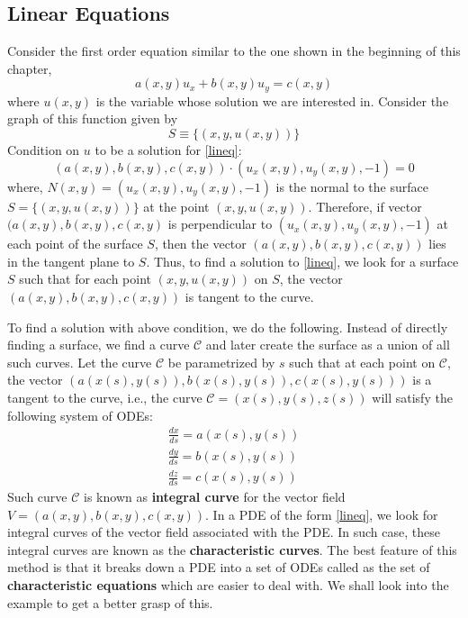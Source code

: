 \documentclass[11pt, a4paper]{report}
\begin{document}
\subsection{Linear Equations} \label{LinEq_sec}
Consider the first order equation similar to the one shown in the beginning of this chapter,
\begin{equation} \label{lineq}
    a(x, y)u_{x} + b(x, y)u_{y} = c(x, y)
\end{equation}
where $u(x, y)$ is the variable whose solution we are interested in. Consider the graph of this function given by
\begin{equation*}
    S \equiv \{(x, y, u(x, y))\}
\end{equation*}
Condition on $u$ to be a solution for \eqref{lineq}:
\begin{equation*}
    (a(x, y), b(x, y), c(x, y))\cdot\left(u_{x}(x, y), u_{y}(x, y), -1\right) = 0
\end{equation*}
where, $N(x, y) = \left(u_{x}(x, y), u_{y}(x, y), -1\right)$ is the normal to the surface $S = \{(x, y, u(x, y))\}$ 
at the point $(x, y, u(x, y))$. Therefore, if vector $(a(x, y), b(x, y), c(x, y)$ is perpendicular to $\left(u_{x}(x, y), u_{y}(x, y), -1\right)$
at each point of the surface $S$, then the vector $(a(x, y), b(x, y), c(x, y))$ lies in the tangent plane to $S$. 
Thus, to find a solution to \eqref{lineq}, we look for a surface $S$ such that for each point $(x, y, u(x, y))$ on 
$S$, the vector $(a(x, y), b(x, y), c(x, y))$ is tangent to the curve. 

To find a solution with above condition, we do the following. Instead of directly finding a surface, we find a curve
$\mathscr{C}$ and later create the surface as a union of all such curves. Let the curve $\mathscr{C}$ be parametrized
by $s$ such that at each point on $\mathscr{C}$, the vector $(a(x(s), y(s)), b(x(s), y(s)), c(x(s), y(s)))$ is a 
tangent to the curve, i.e., the curve $\mathscr{C} = (x(s), y(s), z(s))$ will satisfy the following system of ODEs:
\begin{equation}
    \begin{split}
        \frac{dx}{ds} = a(x(s), y(s))\\
        \frac{dy}{ds} = b(x(s), y(s))\\
        \frac{dz}{ds} = c(x(s), y(s))
    \end{split}
\end{equation}
Such curve $\mathscr{C}$ is known as {\bfseries{integral curve}} for the vector field $V = (a(x, y), b(x, y), c(x, y))$. 
In a PDE of the form \eqref{lineq}, we look for integral curves of the vector field associated with the PDE. In 
such case, these integral curves are known as the {\bfseries{characteristic curves}}. The best feature of this 
method is that it breaks down a PDE into a set of ODEs called as the set of {\bfseries{characteristic equations}} 
which are easier to deal with. We shall look into the example to get a better grasp of this.
\end{document}
